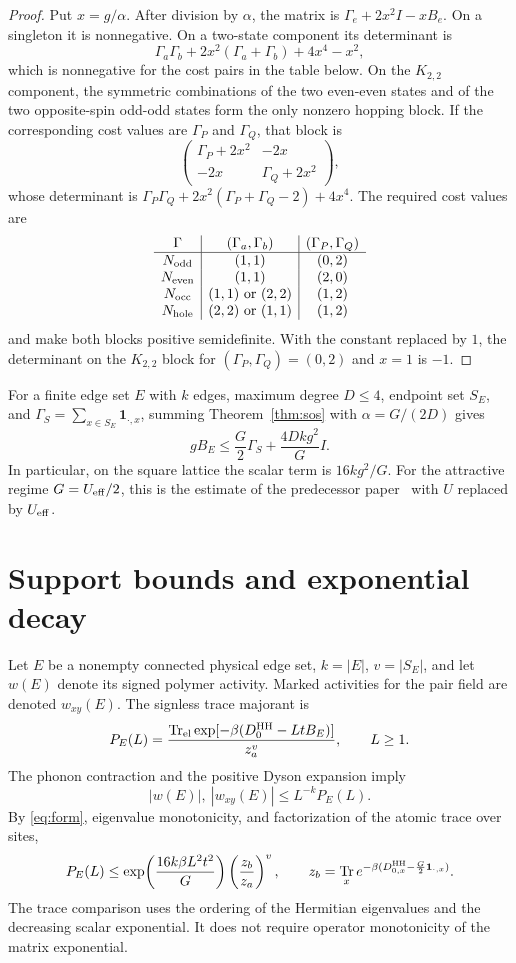 \documentclass[11pt]{article}
\DeclareMathOperator{\Tr}{Tr}
\begin{document}
\begin{proof}
Put $x=g/\alpha$. After division by $\alpha$, the matrix is $\Gamma_e+2x^2I-xB_e$. On a singleton it is nonnegative. On a two-state component its determinant is
\[
 \Gamma_a\Gamma_b+2x^2(\Gamma_a+\Gamma_b)+4x^4-x^2,
\]
which is nonnegative for the cost pairs in the table below. On the $K_{2,2}$ component, the symmetric combinations of the two even-even states and of the two opposite-spin odd-odd states form the only nonzero hopping block. If the corresponding cost values are $\Gamma_P$ and $\Gamma_Q$, that block is
\[
 \begin{pmatrix}\Gamma_P+2x^2&-2x\\-2x&\Gamma_Q+2x^2\end{pmatrix},
\]
whose determinant is $\Gamma_P\Gamma_Q+2x^2(\Gamma_P+\Gamma_Q-2)+4x^4$. The required cost values are
\[
\begin{array}{c|c|c}
\Gamma & (\Gamma_a,\Gamma_b) & (\Gamma_P,\Gamma_Q)\\
\hline
N_{\rm odd}&(1,1)&(0,2)\\
N_{\rm even}&(1,1)&(2,0)\\
N_{\rm occ}&(1,1)\text{ or }(2,2)&(1,2)\\
N_{\rm hole}&(2,2)\text{ or }(1,1)&(1,2)
\end{array}
\]
and make both blocks positive semidefinite. With the constant replaced by $1$, the determinant on the $K_{2,2}$ block for $(\Gamma_P,\Gamma_Q)=(0,2)$ and $x=1$ is $-1$.
\end{proof}

For a finite edge set $E$ with $k$ edges, maximum degree $D\le4$, endpoint set $S_E$, and $\Gamma_S=\sum_{x\in S_E}\mathbf1_{\cdot,x}$, summing Theorem~\ref{thm:sos} with $\alpha=G/(2D)$ gives
\begin{equation}\label{eq:form}
 gB_E\le\frac G2\Gamma_S+\frac{4Dkg^2}{G}I.
\end{equation}
In particular, on the square lattice the scalar term is $16kg^2/G$. For the attractive regime $G=U_{\rm eff}/2$, this is the estimate of the predecessor paper~\cite{stage6} with $U$ replaced by $U_{\rm eff}$.

\section{Support bounds and exponential decay}

Let $E$ be a nonempty connected physical edge set, $k=|E|$, $v=|S_E|$, and let $w(E)$ denote its signed polymer activity. Marked activities for the pair field are denoted $w_{xy}(E)$. The signless trace majorant is
\[
 P_E(L)=\frac{\Tr_{\rm el}\exp[-\beta(D_0^{\rm HH}-LtB_E)]}{z_a^v},
 \qquad L\ge1.
\]
The phonon contraction and the positive Dyson expansion imply
\[
 |w(E)|,\ |w_{xy}(E)|\le L^{-k}P_E(L).
\]
By \eqref{eq:form}, eigenvalue monotonicity, and factorization of the atomic trace over sites,
\[
 P_E(L)\le\exp\!\left(\frac{16k\beta L^2t^2}{G}\right)
                 \left(\frac{z_b}{z_a}\right)^v,
 \qquad
 z_b=\Tr_x e^{-\beta(D_{0,x}^{\rm HH}-\frac G2\mathbf1_{\cdot,x})}.
\]
The trace comparison uses the ordering of the Hermitian eigenvalues and the decreasing scalar exponential. It does not require operator monotonicity of the matrix exponential.
\end{document}
